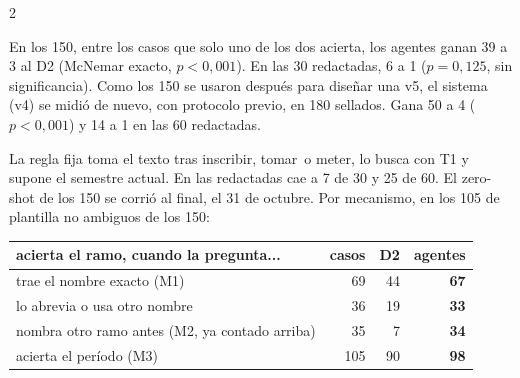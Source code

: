 \documentclass[9pt,a4paper]{extarticle}
\newcommand{\seccion}[1]{\vspace{0.6mm}{\bfseries\footnotesize\color{acento}\MakeUppercase{#1}}\par\nobreak\vspace{0.4mm}\nobreak}
\newcommand{\q}{\textquotedbl}
\newcommand{\destaque}[1]{%
  \begingroup\setlength{\fboxsep}{2.0mm}%
  \colorbox{fondo}{\parbox{\dimexpr\columnwidth-4.0mm\relax}{#1}}%
  \endgroup\par}
\begin{document}
\begin{multicols}{2}
\vspace{1mm}
\destaque{\footnotesize En los 150, entre los casos que solo uno de los dos acierta, los agentes ganan 39 a 3 al D2 (McNemar exacto, $p<0{,}001$). En las 30 redactadas, 6 a 1 ($p=0{,}125$, sin significancia). Como los 150 se usaron después para diseñar una v5, el sistema (v4) se midió de nuevo, con protocolo previo, en 180 sellados. Gana 50 a 4 ($p<0{,}001$) y 14 a 1 en las 60 redactadas.}

\vspace{0.6mm}
{\footnotesize
La regla fija toma el texto tras \q inscribir\q, \q tomar\q\ o \q meter\q, lo busca con T1 y
supone el semestre actual. En las redactadas cae a 7 de 30 y 25 de 60. El zero-shot de los 150 se
corrió al final, el 31 de octubre. Por mecanismo, en los 105 de plantilla no ambiguos de los 150:\par}

\vspace{0.3mm}
{\footnotesize
\begin{tabular}{@{}lrrr@{}}
\toprule
acierta el ramo, cuando la pregunta... & casos & D2 & agentes \\
\midrule
trae el nombre exacto (M1)            & 69 & 44 & \textbf{67} \\
lo abrevia o usa otro nombre          & 36 & 19 & \textbf{33} \\
nombra otro ramo antes (M2, ya contado arriba) & 35 &  7 & \textbf{34} \\
\midrule
acierta el período (M3)               & 105 & 90 & \textbf{98} \\
\bottomrule
\end{tabular}\par}

\seccion{Técnicas y ablación}


\end{multicols}
\end{document}
